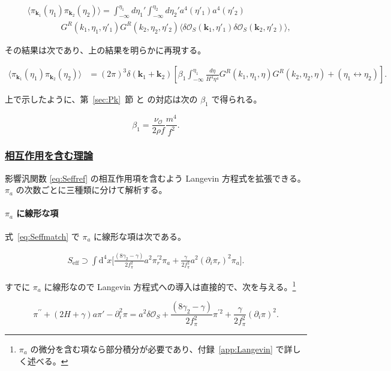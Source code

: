 \documentclass[a4paper,11pt]{ltjsarticle}
\numberwithin{equation}{section}
\newcommand{\subsubsectionlink}[1]{\subsubsection[#1]{\hyperlink{toc}{#1}}}
\def\pia{\pi_{a}}
\def\pir{\pi_{r}}
\def\bfk{\textbf{k}}
\newcommand{\Os}{\delta \mathcal{O}_{S}}
\newcommand{\dd}{\mathrm{d}}
\newcommand{\Eq}[1]{Eq.~(\ref{#1})}
\newcommand{\Sec}[1]{Sec.~\ref{#1}}
\newcommand{\App}[1]{Appendix~\ref{#1}}
\renewcommand{\Eq}[1]{式~\eqref{#1}}
\renewcommand{\Sec}[1]{第~\ref{#1}~節}
\renewcommand{\App}[1]{付録~\ref{#1}}
\begin{document}
\begin{align}
    &\langle\pi_{\bfk_{1}}(\eta_{1})\pi_{\bfk_{2}}(\eta_{2})\rangle=\int_{-\infty}^{\eta_{1}}d\eta_{1}'\int_{-\infty}^{\eta_{2}}d\eta_{2}'a^{4}(\eta'_{1})a^{4}(\eta'_{2})\nonumber \\
    &\qquad \qquad  G^{R}(k_1,\eta_{1},\eta'_{1})G^{R}(k_2, \eta_{2},\eta'_{2})\langle\Os(\bfk_{1},\eta'_{1})\Os(\bfk_{2},\eta'_{2})\rangle,
\end{align}

その結果は次であり、上の結果を明らかに再現する。

\begin{align}
    \langle\pi_{\bfk_{1}}(\eta_{1})\pi_{\bfk_{2}}(\eta_{2})\rangle&=(2\pi)^3\delta(\bfk_{1}+\bfk_{2})\left[\beta_{1}\int_{-\infty}^{\eta_{1}} \frac{d\eta}{H^{4}\eta^{4}}G^{R}(k_1,\eta_{1},\eta)G^{R}(k_2, \eta_{2},\eta) +(\eta_{1}\leftrightarrow\eta_{2})\right].
\end{align}

上で示したように、\Sec{sec:Pk} と \cite{Creminelli:2023aly} の対応は次の $\beta_1$ で得られる。

\begin{equation}
    \beta_{1}=\frac{\nu_{\mathcal{O}}}{2\rho f}\frac{m^{4}}{f^{2}}.
\end{equation}

\subsubsectionlink{相互作用を含む理論}

影響汎関数 \eqref{eq:Seffref} の相互作用項を含むよう Langevin 方程式を拡張できる。$\pia$ の次数ごとに三種類に分けて解析する。

\paragraph{$\pia$ に線形な項} \Eq{eq:Seffmatch} で $\pia$ に線形な項は次である。

\begin{align}
S_{\text{eff}} \supset  \int \dd^4 x \Big[\frac{ \left(8\gamma_2 - \gamma\right)}{2f^{2}_{\pi}}    a^2\pir^{\prime2} \pia	+ \frac{\gamma}{2f_{\pi}^{2}} a^2	\left(\partial_i \pir \right)^2 \pia\Big].
\end{align}

すでに $\pia$ に線形なので Langevin 方程式への導入は直接的で、次を与える。\footnote{$\pia$ の微分を含む項なら部分積分が必要であり、\App{app:Langevin} で詳しく述べる。}

\begin{equation}
\pi^{\prime \prime}+\left( 2H + \gamma\right)a\pi'-\partial_{i}^{2}\pi=a^2 \Os+\frac{ \left(8\gamma_2 - \gamma\right)}{2f^{2}_{\pi}}  \pi^{\prime2}+\frac{\gamma}{2f_{\pi}^{2}} 	\left(\partial_i \pi \right)^2.
\end{equation}
\end{document}
